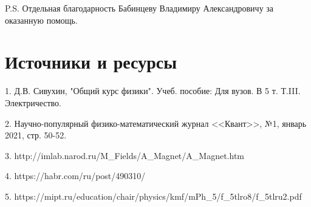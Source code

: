\documentclass[a4paper,12pt]{article} %
\begin{document}
P.S. Отдельная благодарность Бабинцеву Владимиру Александровичу за оказанную помощь.

\newpage


\section{Источники и ресурсы}

1. Д.В. Сивухин, "Общий курс физики". Учеб. пособие: Для вузов. В 5 т. Т.III. Электричество.

2. Научно-популярный физико-математический журнал <<Квант>>, №1, январь 2021, стр. 50-52.

3. http://imlab.narod.ru/M_Fields/A_Magnet/A_Magnet.htm

4. https://habr.com/ru/post/490310/

5. https://mipt.ru/education/chair/physics/kmf/mPh_5/f_5tlro8/f_5tlru2.pdf
\end{document}
